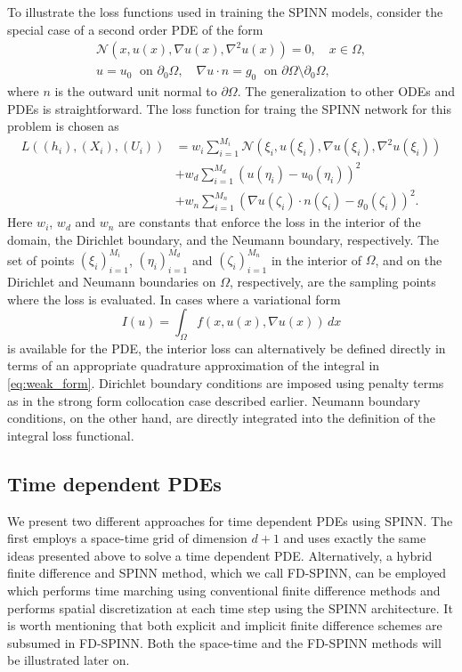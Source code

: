 \documentclass[12pt]{article}
\begin{document}
To illustrate the loss functions used in training the SPINN models, consider the special case of a second order PDE of the form
\begin{displaymath}
\begin{split}
\mathcal{N}(x, u(x), \nabla u(x), \nabla^2 u(x)) = 0, \quad x \in \Omega,\\
u = u_0 \;\text{ on }\partial_0 \Omega, \quad \nabla u \cdot n = g_0 \;\text{ on } \partial \Omega \setminus \partial_0 \Omega,
\end{split}
\end{displaymath}
where $n$ is the outward unit normal to $\partial \Omega$. The generalization to other ODEs and PDEs is straightforward. The loss function for traing the SPINN network for this problem is chosen as
\begin{equation} \label{eq:spinn_loss}
\begin{split}
L((h_i), (X_i), (U_i)) &= w_i \sum_{i=1}^{M_i} \mathcal{N}(\xi_i, u(\xi_i), \nabla u(\xi_i), \nabla^2 u(\xi_i))\\
 &+ w_d \sum_{i=1}^{M_d} (u(\eta_i) - u_0(\eta_i))^2\\
 &+ w_n \sum_{i=1}^{M_n} \left(\nabla u(\zeta_i)\cdot n(\zeta_i) - g_0(\zeta_i)\right)^2.
\end{split}
\end{equation}
Here $w_i$, $w_d$ and $w_n$ are constants that enforce the loss in the interior of the domain, the Dirichlet boundary, and the Neumann boundary, respectively. The set of points $(\xi_i)_{i=1}^{M_i}$, $(\eta_i)_{i=1}^{M_d}$ and $(\zeta_i)_{i=1}^{M_n}$ in the interior of $\Omega$, and on the Dirichlet and Neumann boundaries on $\Omega$, respectively, are the sampling points where the loss is evaluated. In cases where a variational form
\begin{equation} \label{eq:weak_form}
I(u) = \int_{\Omega} f(x, u(x), \nabla u(x))\,dx
\end{equation}
is available for the PDE, the interior loss can alternatively be defined directly in terms of an appropriate quadrature approximation of the integral in \eqref{eq:weak_form}. Dirichlet boundary conditions are imposed using penalty terms as in the strong form collocation case described earlier. Neumann boundary conditions, on the other hand, are directly integrated into the definition of the integral loss functional.

\subsection{Time dependent PDEs}
We present two different approaches for time dependent PDEs using SPINN. The first employs a space-time grid of dimension $d + 1$ and uses exactly the same ideas presented above to solve a time dependent PDE. Alternatively, a hybrid finite difference and SPINN method, which we call FD-SPINN, can be employed which performs time marching using conventional finite difference methods and performs spatial discretization at each time step using the SPINN architecture. It is worth mentioning that both explicit and implicit finite difference schemes are subsumed in FD-SPINN. Both the space-time and the FD-SPINN methods will be illustrated later on.
\end{document}
